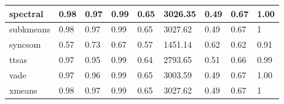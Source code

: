 \begin{table}[H]
\begin{tabular}{|l|l|l|l|l|l|l|l|l|}
\hline
spectral & 0.98 & 0.97 & 0.99 & 0.65 & 3026.35 & 0.49 & 0.67 & 1.00 \\
\hline
subkmeans & 0.98 & 0.97 & 0.99 & 0.65 & 3027.62 & 0.49 & 0.67 & 1 \\
\hline
syncsom & 0.57 & 0.73 & 0.67 & 0.57 & 1451.14 & 0.62 & 0.62 & 0.91 \\
\hline
ttsas & 0.97 & 0.95 & 0.99 & 0.64 & 2793.65 & 0.51 & 0.66 & 0.99 \\
\hline
vade & 0.97 & 0.96 & 0.99 & 0.65 & 3003.59 & 0.49 & 0.67 & 1.00 \\
\hline
xmeans & 0.98 & 0.97 & 0.99 & 0.65 & 3027.62 & 0.49 & 0.67 & 1 \\
\hline
\end{tabular}
\end{table}